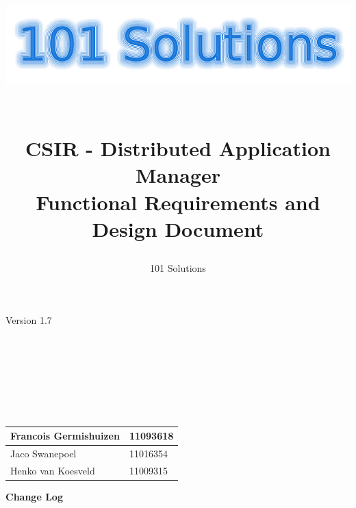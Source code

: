 \documentclass[a4paper,12pt,final]{article}
\title{
\begin{center}
  	\includegraphics[scale=0.3]{101Logo.png} 
  \end{center}
  \textbf{\\}
CSIR - Distributed Application Manager\\
Functional Requirements and Design Document\\
}
\author{101 Solutions}
\begin{document}
\maketitle
\begin{center}
Version 1.7
\end{center}
\textbf{\\}
\textbf{\\}
\textbf{\\}
\textbf{\\}
\textbf{\\}
\textbf{\\}
\begin{center}
\begin{tabular}{|l|l|}
\hline
Francois Germishuizen & 11093618\\
\hline
Jaco Swanepoel & 11016354\\
\hline
Henko van Koesveld & 11009315\\
\hline
\end{tabular}
\end{center}
\thispagestyle{empty}
\newpage
\thispagestyle{empty}
\textbf{\large{Change Log}}
\vspace{6pt}\newline
\end{document}
